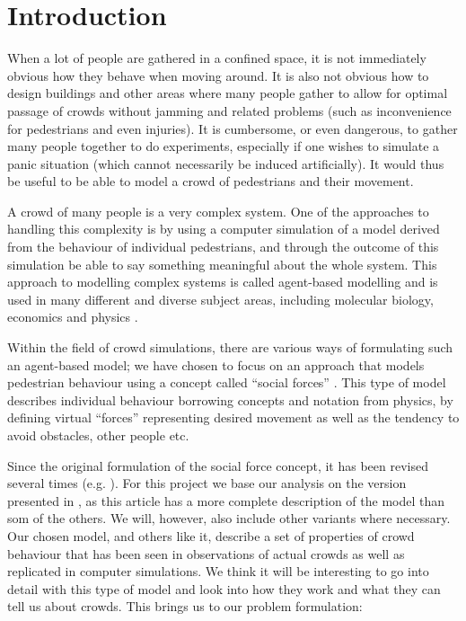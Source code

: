 \section{Introduction}
When a lot of people are gathered in a confined space, it is not immediately 
obvious how they behave when moving around. It is also not obvious how to 
design buildings and other areas where many people gather to allow for optimal 
passage of crowds without jamming and related problems (such as inconvenience 
for pedestrians and even injuries). It is cumbersome, or even dangerous, to 
gather many people together to do experiments, especially if one wishes to 
simulate a panic situation (which cannot necessarily be induced artificially). 
It would thus be useful to be able to model a crowd of pedestrians and their 
movement.

A crowd of many people is a very complex system. One of the approaches to 
handling this complexity is by using a computer simulation of a model derived 
from the behaviour of individual pedestrians, and through the outcome of this 
simulation be able to say something meaningful about the whole system. This 
approach to modelling complex systems is called agent-based modelling and is 
used in many different and diverse subject areas, including molecular biology, 
economics and physics \cite{simintro,finans,fish}.

Within the field of crowd simulations, there  are various ways of formulating 
such an agent-based model; we have chosen to focus on an approach that models 
pedestrian behaviour using a concept called ``social forces'' 
\cite{social-force}. This type of model describes individual behaviour 
borrowing concepts and notation from physics, by defining  virtual ``forces'' 
representing desired movement as well as the tendency to avoid obstacles, 
other people etc.

Since the original formulation of the social force concept, it has been 
revised several times (e.g.  \cite{helbing00}). For this project we base our 
analysis on the  version presented in \cite{self-org}, as this article has a 
more complete description of the model than som of the others. We will, 
however, also include other variants where necessary.  Our chosen model, and 
others like it, describe a set of properties of crowd behaviour that has been 
seen in observations of actual crowds as well as replicated in computer 
simulations.  We think it will be interesting to go into detail with this type 
of model and look into how they work and what they can tell us about crowds.  
This brings us to our problem formulation:

